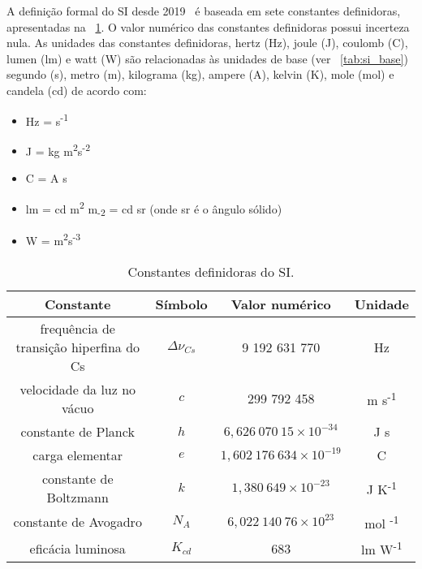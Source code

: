 \documentclass{book}
\begin{document}
A definição formal do SI desde 2019~\cite{si-brochure,si-ptbr} é baseada em sete constantes definidoras, apresentadas na \tablename~\ref{tab:si_cte}. O valor numérico das constantes definidoras possui incerteza nula. As unidades das constantes definidoras, hertz (Hz), joule (J), coulomb (C), lumen (lm) e watt (W) são relacionadas às unidades de base (ver \tablename~\ref{tab:si_base}) segundo (s), metro (m), kilograma (kg), ampere (A), kelvin (K), mole (mol) e candela (cd) de acordo com:
\begin{itemize}
\item Hz = s\textsuperscript{-1}
\item J = kg m\textsuperscript{2}s\textsuperscript{-2}
\item C = A s
\item lm = cd m\textsuperscript{2} m\textsubscript{-2} = cd sr (onde sr é o ângulo sólido)
  \item W = m\textsuperscript{2}s\textsuperscript{-3}
\end{itemize}

\begin{table}[!ht]
\centering
\caption{Constantes definidoras do SI.}
\begin{tabular}{cccc}
  \toprule[.8pt]
  Constante & Símbolo & Valor numérico & Unidade \\
  \midrule[.5pt]
  frequência de transição hiperfina do Cs & $\Delta \nu_{Cs}$ & 9 192 631 770 & Hz \\
  velocidade da luz no vácuo & $c$ & 299 792 458 & m s\textsuperscript{-1} \\
  constante de Planck & $h$ & $6,626~070~15 \times 10^{-34} $ & J s \\
  carga elementar & $e$ & $1,602~176~634 \times 10^{-19}$ & C \\
  constante de Boltzmann & $k$ & $1,380~649 \times 10^{-23} $ & J K\textsuperscript{-1} \\
  constante de Avogadro & $N_A$ & $6,022~140~76 \times 10^{23} $ & mol \textsuperscript{-1} \\
  eficácia luminosa & $K_{cd}$ & 683 & lm W\textsuperscript{-1} \\
  \bottomrule[.8pt]
\end{tabular}
\label{tab:si_cte}
\end{table}

\end{document}
